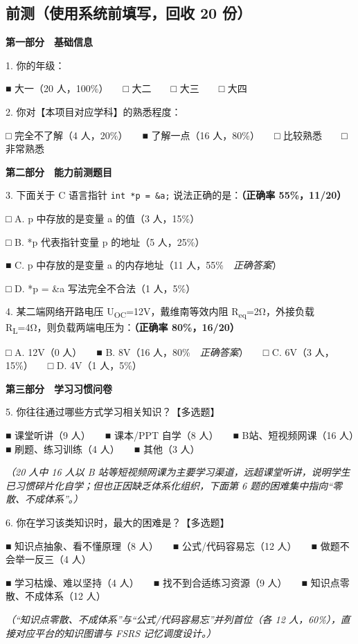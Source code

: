 \documentclass[zihao=-4,a4paper,UTF8,fontset=windows]{ctexart}
\begin{document}
\subsection{前测（使用系统前填写，回收 20 份）}

\textbf{第一部分　基础信息}

1. 你的年级：

■ 大一（20 人，100\%）　　□ 大二　　□ 大三　　□ 大四

2. 你对【本项目对应学科】的熟悉程度：

□ 完全不了解（4 人，20\%）　　■ 了解一点（16 人，80\%）　　□ 比较熟悉　　□ 非常熟悉

\textbf{第二部分　能力前测题目}

3. 下面关于 C 语言指针 \texttt{int *p = \&a;} 说法正确的是：\textbf{（正确率 55\%，11/20）}

□ A. p 中存放的是变量 a 的值（3 人，15\%）

□ B. *p 代表指针变量 p 的地址（5 人，25\%）

■ C. p 中存放的是变量 a 的内存地址（11 人，55\%　\textit{正确答案}）

□ D. *p = \&a 写法完全不合法（1 人，5\%）

4. 某二端网络开路电压 U\textsubscript{OC}=12V，戴维南等效内阻 R\textsubscript{eq}=2Ω，外接负载 R\textsubscript{L}=4Ω，则负载两端电压为：\textbf{（正确率 80\%，16/20）}

□ A. 12V（0 人）　　■ B. 8V（16 人，80\%　\textit{正确答案}）　　□ C. 6V（3 人，15\%）　　□ D. 4V（1 人，5\%）

\textbf{第三部分　学习习惯问卷}

5. 你往往通过哪些方式学习相关知识？【多选题】

■ 课堂听讲（9 人）　　■ 课本/PPT 自学（8 人）　　■ B站、短视频网课（16 人）　　■ 刷题、练习训练（4 人）　　■ 其他（3 人）

\textit{（20 人中 16 人以 B 站等短视频网课为主要学习渠道，远超课堂听讲，说明学生已习惯碎片化自学；但也正因缺乏体系化组织，下面第 6 题的困难集中指向“零散、不成体系”。）}

6. 你在学习该类知识时，最大的困难是？【多选题】

■ 知识点抽象、看不懂原理（8 人）　　■ 公式/代码容易忘（12 人）　　■ 做题不会举一反三（4 人）

■ 学习枯燥、难以坚持（4 人）　　■ 找不到合适练习资源（9 人）　　■ 知识点零散、不成体系（12 人）

\textit{（“知识点零散、不成体系”与“公式/代码容易忘”并列首位（各 12 人，60\%），直接对应平台的知识图谱与 FSRS 记忆调度设计。）}
\end{document}
